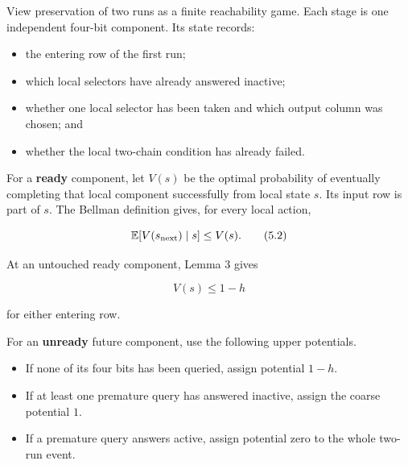 \documentclass[11pt,a4paper]{article}
\begin{document}
View preservation of two runs as a finite reachability game.  Each stage is one independent four-bit component.  Its state records:


\begin{itemize}

\item the entering row of the first run;

\item which local selectors have already answered inactive;

\item whether one local selector has been taken and which output column was chosen; and

\item whether the local two-chain condition has already failed.

\end{itemize}

For a \textbf{ready} component, let \(V(s)\) be the optimal probability of eventually completing that local component successfully from local state \(s\).  Its input row is part of \(s\).  The Bellman definition gives, for every local action,


\begin{equation}
                 \mathbb E[V(s_{\rm next})\mid s]
                         \le V(s).
\tag{5.2}
\end{equation}

At an untouched ready component, Lemma 3 gives


\begin{equation}
                         V(s)\le1-h
\tag{5.3}
\end{equation}

for either entering row.


For an \textbf{unready} future component, use the following upper potentials.


\begin{itemize}

\item If none of its four bits has been queried, assign potential \(1-h\).

\item If at least one premature query has answered inactive, assign the coarse potential \(1\).

\item If a premature query answers active, assign potential zero to the whole two-run event.

\end{itemize}
\end{document}
